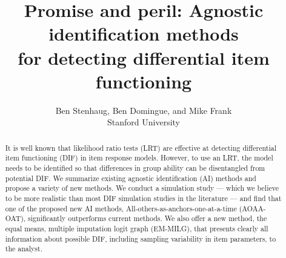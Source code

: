 \documentclass[
  11pt,
]{article}
\title{Promise and peril: Agnostic identification methods\\
for detecting differential item functioning}
\subtitle{Ben Stenhaug, Ben Domingue, and Mike Frank\\
Stanford University}
\author{}
\date{\vspace{-2.5em}}
\begin{document}
\maketitle
\begin{abstract}
It is well known that likelihood ratio tests (LRT) are effective at detecting differential item functioning (DIF) in item response models. However, to use an LRT, the model needs to be identified so that differences in group ability can be disentangled from potential DIF. We summarize existing agnostic identification (AI) methods and propose a variety of new methods. We conduct a simulation study --- which we believe to be more realistic than most DIF simulation studies in the literature --- and find that one of the proposed new AI methods, All-others-as-anchors-one-at-a-time (AOAA-OAT), significantly outperforms current methods. We also offer a new method, the equal means, multiple imputation logit graph (EM-MILG), that presents clearly all information about possible DIF, including sampling variability in item parameters, to the analyst. \clearpage
\end{abstract}
\end{document}
